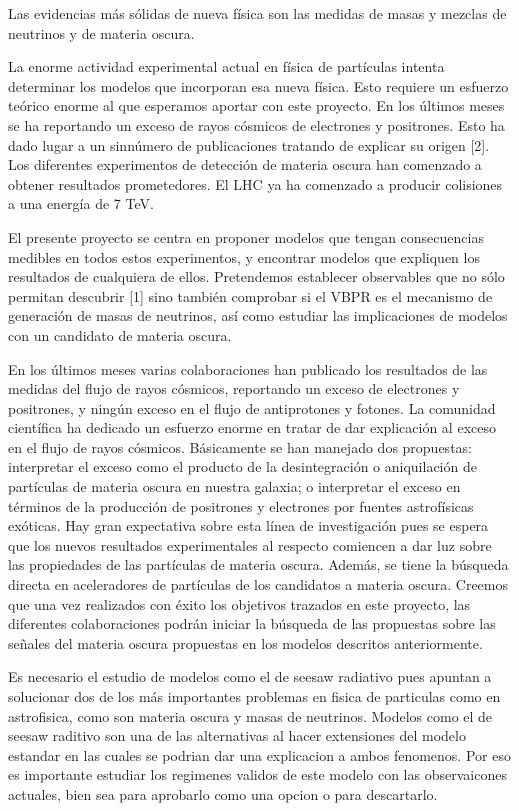 Las evidencias más sólidas de nueva física son las medidas de masas y mezclas de neutrinos y de materia oscura.

La enorme actividad experimental actual en física de partículas intenta determinar los modelos que incorporan esa nueva física. Esto requiere un esfuerzo teórico enorme al que esperamos aportar con este proyecto. En los últimos meses se ha reportando un exceso de rayos cósmicos de electrones y positrones.  Esto ha dado lugar a un sinnúmero de publicaciones tratando de explicar su origen [2]. Los diferentes experimentos de detección de materia oscura han comenzado a obtener resultados prometedores. El LHC ya ha comenzado a producir colisiones a una energía de 7 TeV.

El presente proyecto se centra en proponer modelos que tengan consecuencias medibles en todos estos experimentos, y encontrar modelos que expliquen los resultados de cualquiera de ellos. Pretendemos establecer observables que no sólo permitan descubrir [1] sino también  comprobar si el VBPR es el mecanismo de generación de masas de neutrinos, así como estudiar las implicaciones de modelos con un candidato de materia oscura. 

\newpage{}
En los últimos meses varias colaboraciones han publicado los resultados de las medidas del flujo de rayos cósmicos, reportando un exceso de electrones y positrones, y ningún exceso en el flujo de antiprotones y fotones. 
La comunidad científica ha dedicado un esfuerzo enorme en tratar de dar explicación al exceso en el flujo de rayos cósmicos. Básicamente se han manejado dos propuestas: interpretar el exceso como el producto de la desintegración o aniquilación de partículas de materia oscura en nuestra galaxia; o interpretar el exceso en términos de la producción de positrones y electrones por fuentes astrofísicas exóticas. 
Hay gran expectativa sobre esta línea de investigación pues se espera que los nuevos resultados experimentales al respecto comiencen a dar luz sobre las propiedades de las partículas de materia oscura. Además, se tiene la  búsqueda directa en aceleradores de partículas de  los candidatos a materia oscura.
Creemos que una vez realizados con éxito los objetivos trazados en este proyecto,  las diferentes colaboraciones podrán iniciar la búsqueda de las propuestas sobre las señales del materia oscura propuestas en los modelos descritos anteriormente.





Es necesario el estudio de modelos como el de seesaw radiativo pues apuntan a solucionar dos de los más importantes problemas en fisica de particulas como en astrofisica, como son materia oscura y masas de neutrinos. Modelos como el de seesaw raditivo son una de las alternativas al hacer extensiones del modelo estandar en las cuales se podrian dar una explicacion a ambos fenomenos. Por eso es importante estudiar los regimenes validos de este modelo con las observaicones actuales, bien sea para aprobarlo como una opcion o para descartarlo.


